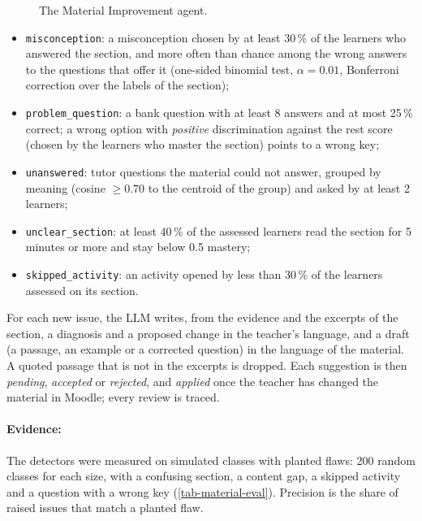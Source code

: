 \begin{figure}[htbp]
  \centering
  \caption{The Material Improvement agent.}
  \label{fig-material-pipeline}
\end{figure}

\begin{itemize}
  \item \texttt{misconception}: a misconception chosen by at least 30\,\%
        of the learners who answered the section, and more often than
        chance among the wrong answers to the questions that offer it
        (one-sided binomial test, $\alpha = 0.01$, Bonferroni correction
        over the labels of the section);
  \item \texttt{problem\_question}: a bank question with at least
        8 answers and at most 25\,\% correct; a wrong option with
        \emph{positive} discrimination against the rest score (chosen by
        the learners who master the section) points to a wrong key;
  \item \texttt{unanswered}: tutor questions the material could not
        answer, grouped by meaning (cosine $\geq 0.70$ to the centroid of
        the group) and asked by at least 2 learners;
  \item \texttt{unclear\_section}: at least 40\,\% of the assessed
        learners read the section for 5 minutes or more and stay below
        0.5 mastery;
  \item \texttt{skipped\_activity}: an activity opened by less than
        30\,\% of the learners assessed on its section.
\end{itemize}
For each new issue, the LLM writes, from the evidence and the excerpts of
the section, a diagnosis and a proposed change in the teacher's language,
and a draft (a passage, an example or a corrected question) in the
language of the material. A quoted passage that is not in the excerpts is
dropped. Each suggestion is then \emph{pending}, \emph{accepted} or
\emph{rejected}, and \emph{applied} once the teacher has changed the
material in Moodle; every review is traced.

\paragraph{Evidence:} The detectors were measured on simulated classes
with planted flaws: 200 random classes for each size, with a confusing
section, a content gap, a skipped activity and a question with a wrong
key (\cref{tab-material-eval}). Precision is the share of raised issues
that match a planted flaw.

